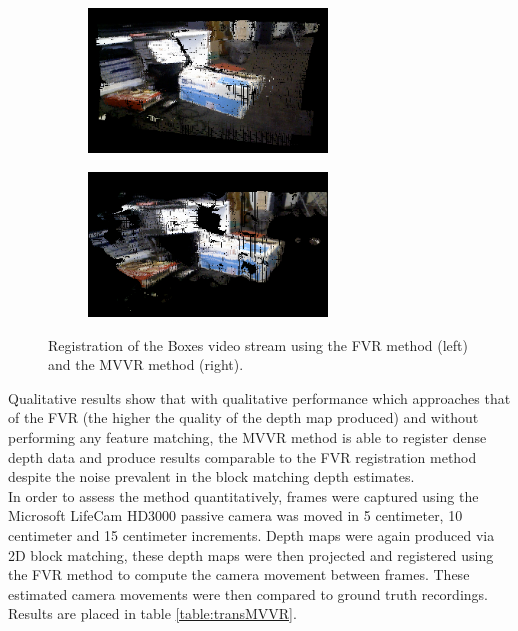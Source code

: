 \begin{figure}[!htb]
        \centering
        \begin{subfigure}[b]{2.8in}
                \includegraphics[width=2.5in]{images/results/mvvr/boxesFVR}
                \label{fig:boxFVRRes}
        \end{subfigure}%
        \begin{subfigure}[b]{2.8in}
                \includegraphics[width=2.5in]{images/results/mvvr/boxesMVVR}
                \label{fig:boxMVVRRes}
        \end{subfigure}
        \caption{Registration of the Boxes video stream using the FVR method (left) and the MVVR method (right).}
       \label{fig:boxesMVVRQResults}
\end{figure}

Qualitative results show that with qualitative performance which approaches that of the FVR (the higher the quality of the depth map produced) and without performing any feature matching, the MVVR method is able to register dense depth data and produce results comparable to the FVR registration method despite the noise prevalent in the block matching depth estimates. \\

In order to assess the method quantitatively, frames were captured using the Microsoft LifeCam HD3000 passive camera was moved in 5 centimeter, 10 centimeter and 15 centimeter increments. Depth maps were again produced via 2D block matching, these depth maps were then projected and registered using the FVR method to compute the camera movement between frames. These estimated camera movements were then compared to ground truth recordings. Results are placed in table \ref{table:transMVVR}.

